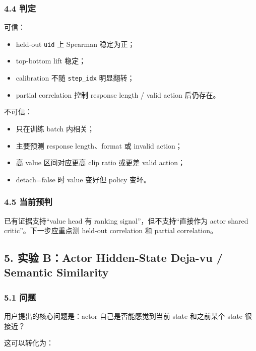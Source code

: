 \documentclass[
  10pt,
]{ctexart}
\providecommand{\tightlist}{%
  \setlength{\itemsep}{0pt}\setlength{\parskip}{0pt}}
\begin{document}
\subsubsection{4.4 判定}\label{ux5224ux5b9a}

可信：

\begin{itemize}
\tightlist
\item
  held-out \texttt{uid} 上 Spearman 稳定为正；
\item
  top-bottom lift 稳定；
\item
  calibration 不随 \texttt{step\_idx} 明显翻转；
\item
  partial correlation 控制 response length / valid action 后仍存在。
\end{itemize}

不可信：

\begin{itemize}
\tightlist
\item
  只在训练 batch 内相关；
\item
  主要预测 response length、format 或 invalid action；
\item
  高 value 区间对应更高 clip ratio 或更差 valid action；
\item
  detach=false 时 value 变好但 policy 变坏。
\end{itemize}

\subsubsection{4.5 当前预判}\label{ux5f53ux524dux9884ux5224}

已有证据支持``value head 有 ranking signal''，但不支持``直接作为 actor
shared critic''。下一步应重点测 held-out correlation 和 partial
correlation。

\subsection{5. 实验 B：Actor Hidden-State Deja-vu / Semantic
Similarity}\label{ux5b9eux9a8c-bactor-hidden-state-deja-vu-semantic-similarity}

\subsubsection{5.1 问题}\label{ux95eeux9898-2}

用户提出的核心问题是：actor 自己是否能感觉到当前 state 和之前某个 state
很接近？

这可以转化为：
\end{document}
